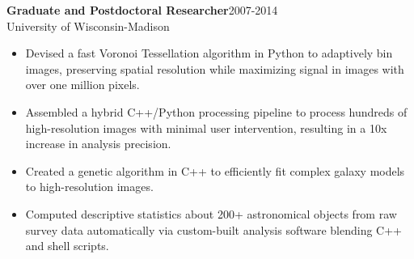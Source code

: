 \documentclass[11pt]{res}
\begin{document}
\begin{resume}
\begin{itemize}
                  \end{itemize} 
\vspace{-0.15in}
{\bf Graduate and Postdoctoral Researcher}\hfill\mbox{2007-2014}\\
University of Wisconsin-Madison
                  \vspace* {0.01 in}\begin{itemize} \itemsep -2pt
                    \item Devised a fast Voronoi Tessellation
                      algorithm in Python
                      to adaptively bin images, preserving spatial
                      resolution while maximizing signal in images
                      with over one million pixels.
                   \item Assembled a hybrid C++/Python processing
                     pipeline to process hundreds of high-resolution images with
                     minimal user intervention, resulting in a 10x increase in analysis precision.
                   \item Created a genetic
                     algorithm in C++ to efficiently fit complex galaxy models to high-resolution images.
                  \item Computed descriptive statistics about
                    200+ astronomical objects from raw survey data
                    automatically via custom-built analysis software
                    blending C++ and shell scripts.
                  \end{itemize} 
\vspace{-0.1in}

\end{resume}
\end{document}
